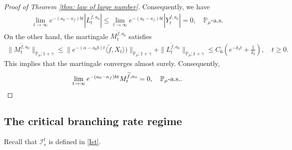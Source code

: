 \documentclass[12pt,a4paper]{amsart}
\theoremstyle{plain}
\theoremstyle{definition}
\numberwithin{equation}{section}
\begin{document}
\begin{proof}[Proof of Theorem \ref{thm: law of large number}]
Consequently,  we have
\begin{align}
    \lim_{t\rightarrow \infty}e^{-(a_0 - \kappa_f)bt}|L_t^{\widetilde{f},a_0}|
    \leq  \lim_{t\rightarrow \infty}e^{-(a_0 - \kappa_f)bt}|Y_t^{\widetilde{f},a_0}|=0, \quad
     \mathbb P_\mu\text{-a.s.}
\end{align}
	On the other hand, the martingale $M_t^{\widetilde{f},a_0}$ satisfies
\begin{align}
    \|M_t^{\widetilde{f},a_0}\|_{\mathbb{P}_{\mu};1+\gamma}
    \leq  \|e^{-(\alpha-a_0 b)t}\langle \widetilde{f},X_t\rangle)\|_{\mathbb{P}_{\mu};1+\gamma}+\|L_t^{\widetilde{f},a_0}\|_{\mathbb{P}_{\mu};1+\gamma}
    \leq C_6(e^{-\delta_3 t}+\frac{1}{\delta_3}),
    \quad t\geq 0.
\end{align}
	This implies that the martingale converges almost surely.
	Consequently,
\[
	\lim_{t\rightarrow\infty} e^{-(a_0-\kappa_f)bt}M_t^{\widetilde{f},a_0}
	=0,
	\quad \mathbb P_\mu\text{-a.s.}.
    \qedhere
\]
\end{proof}

\subsection{The critical branching rate regime}
\label{sec:critical}

    Recall that $\mathcal I_s^t$ is defined in \eqref{Ist}.
\end{document}
